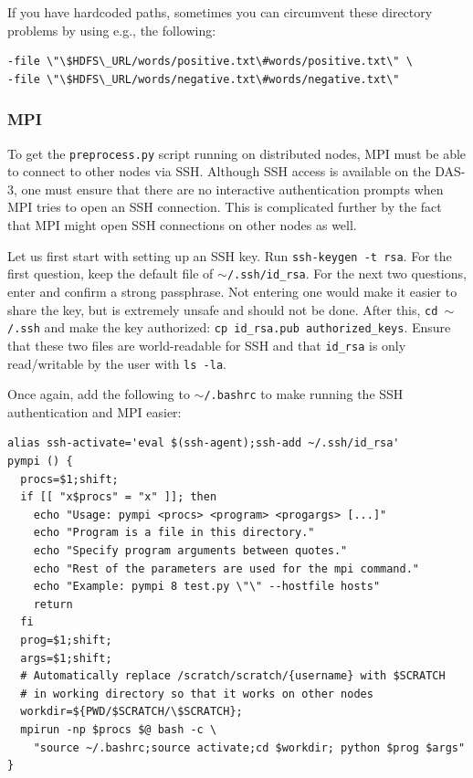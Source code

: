 \documentclass{article}
\begin{document}
If you have hardcoded paths, sometimes you can circumvent these directory 
problems by using e.g., the following:
\begin{verbatim}
-file \"\$HDFS\_URL/words/positive.txt\#words/positive.txt\" \
-file \"\$HDFS\_URL/words/negative.txt\#words/negative.txt\"
\end{verbatim}

\subsubsection{MPI}\label{app:mpi}
To get the \texttt{preprocess.py} script running on distributed nodes, MPI must 
be able to connect to other nodes via SSH\@. Although SSH access is available on
the DAS-3, one must ensure that there are no interactive authentication prompts
when MPI tries to open an SSH connection. This is complicated further by the fact
that MPI might open SSH connections on other nodes as well.

Let us first start with setting up an SSH key. Run \texttt{ssh-keygen -t rsa}. 
For the first question, keep the default file of \texttt{$\sim$/.ssh/id\_rsa}. 
For the next two questions, enter and confirm a strong passphrase. Not entering 
one would make it easier to share the key, but is extremely unsafe and should 
not be done. After this, \texttt{cd $\sim$/.ssh} and make the key authorized: 
\texttt{cp id\_rsa.pub authorized\_keys}. Ensure that these two files are 
world-readable for SSH and that \texttt{id\_rsa} is only read/writable by the 
user with \texttt{ls -la}.

Once again, add the following to \texttt{$\sim$/.bashrc} to make running the 
SSH authentication and MPI easier:

\begin{verbatim}
alias ssh-activate='eval $(ssh-agent);ssh-add ~/.ssh/id_rsa'
pympi () {
  procs=$1;shift;
  if [[ "x$procs" = "x" ]]; then
    echo "Usage: pympi <procs> <program> <progargs> [...]"
    echo "Program is a file in this directory."
    echo "Specify program arguments between quotes."
    echo "Rest of the parameters are used for the mpi command."
    echo "Example: pympi 8 test.py \"\" --hostfile hosts"
    return
  fi
  prog=$1;shift;
  args=$1;shift;
  # Automatically replace /scratch/scratch/{username} with $SCRATCH
  # in working directory so that it works on other nodes
  workdir=${PWD/$SCRATCH/\$SCRATCH};
  mpirun -np $procs $@ bash -c \
    "source ~/.bashrc;source activate;cd $workdir; python $prog $args"
}
\end{verbatim}
\end{document}
